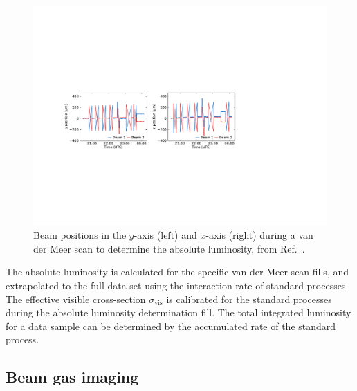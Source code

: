 \begin{figure}[!h]
    \centering
    \includegraphics[width=1.0\textwidth]{figs/Detector/lumi_plots.pdf}
    \caption{Beam positions in the $y$-axis (left) and $x$-axis (right) during a van der Meer scan to determine the absolute luminosity, from Ref.~\cite{1748-0221-9-12-P12005}.}
    \label{fig:Dec_vdm_scan}   
\end{figure}
The absolute luminosity is calculated for the specific van der Meer scan fills, and extrapolated to the full data set using the interaction rate of standard processes. The effective visible cross-section $\sigma_{\text{vis}}$ is calibrated for the standard processes during the absolute luminosity determination fill. The total integrated luminosity for a data sample can be determined by the accumulated rate of the standard process.  


\subsection{Beam gas imaging}

